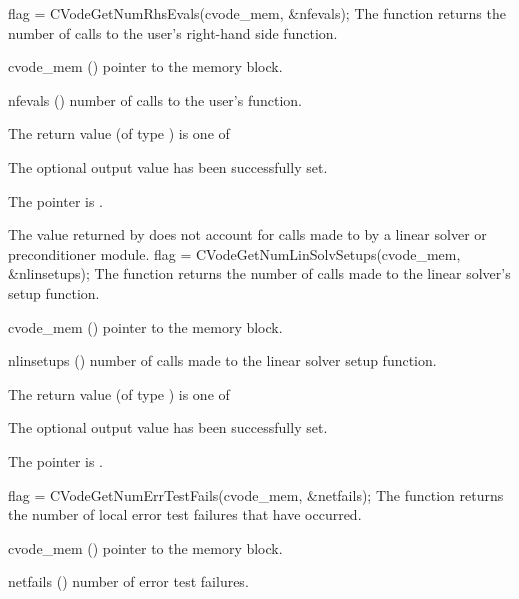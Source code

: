 {}
{
  flag = CVodeGetNumRhsEvals(cvode\_mem, \&nfevals);
}
{
  The function  returns the 
  number of calls to the user's right-hand side function.
}
{
  \begin{args}
  \item[cvode\_mem] ()
    pointer to the {\cvode} memory block.
  \item[nfevals] ()
    number of calls to the user's  function.
  \end{args}
}
{
  The return value  (of type ) is one of
  \begin{args}
  \item[\Id{CV\_SUCCESS}] 
    The optional output value has been successfully set.
  \item[\Id{CV\_MEM\_NULL}]
    The  pointer is .
  \end{args}
}
{
  The  value returned by  does not
  account for calls made to  by a linear solver or preconditioner 
  module. 
}
{
  flag = CVodeGetNumLinSolvSetups(cvode\_mem, \&nlinsetups);
}
{
  The function  returns the
  number of calls made to the linear solver's setup function.
}
{
  \begin{args}[nlinsetups]
  \item[cvode\_mem] ()
    pointer to the {\cvode} memory block.
  \item[nlinsetups] ()
    number of calls made to the linear solver setup function.
  \end{args}
}
{
  The return value  (of type ) is one of
  \begin{args}
  \item[\Id{CV\_SUCCESS}] 
    The optional output value has been successfully set.
  \item[\Id{CV\_MEM\_NULL}]
    The  pointer is .
  \end{args}
}
{}
{
  flag = CVodeGetNumErrTestFails(cvode\_mem, \&netfails);
}
{
  The function  returns the
  number of local error test failures that have occurred.
}
{
  \begin{args}
  \item[cvode\_mem] ()
    pointer to the {\cvode} memory block.
  \item[netfails] ()
    number of error test failures.
  \end{args}
}
